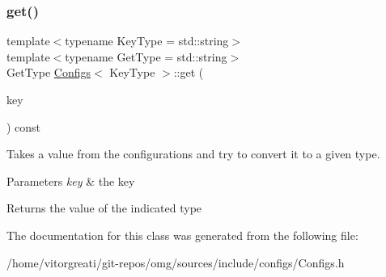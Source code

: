 \subsubsection{\texorpdfstring{get()}{get()}}
{\footnotesize\ttfamily template$<$typename Key\+Type = std\+::string$>$ \\
template$<$typename Get\+Type  = std\+::string$>$ \\
Get\+Type \mbox{\hyperlink{class_configs}{Configs}}$<$ Key\+Type $>$\+::get (\begin{DoxyParamCaption}\item[{const Key\+Type \&}]{key }\end{DoxyParamCaption}) const\hspace{0.3cm}{\ttfamily [inline]}}



Takes a value from the configurations and try to convert it to a given type. 


\begin{DoxyParams}{Parameters}
{\em key} & the key \\
\hline
\end{DoxyParams}
\begin{DoxyReturn}{Returns}
the value of the indicated type 
\end{DoxyReturn}


The documentation for this class was generated from the following file\+:\begin{DoxyCompactItemize}
\item 
/home/vitorgreati/git-\/repos/omg/sources/include/configs/Configs.\+h\end{DoxyCompactItemize}
